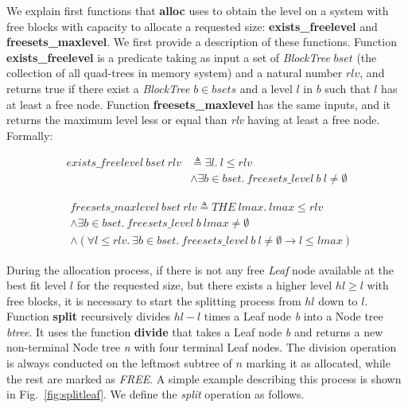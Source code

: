 We explain first functions that \textbf{alloc}  uses to obtain the level on a system with free blocks with capacity to allocate a requested size: \textbf{exists\_freelevel} and \textbf{freesets\_maxlevel}. We first provide a description of these functions. Function \textbf{exists\_freelevel} is a predicate taking as input a set of \emph{BlockTree} $bset$ (the collection of all quad-trees in memory system) and a natural number $rlv$, and returns true if there exist a \emph{BlockTree} $b\in bsets$ and a level $l$ in $b$ such that $l$ has at least a free node. Function \textbf{freesets\_maxlevel} has the same inputs, and it returns the maximum level less or equal than \emph{rlv} having at least a free node. Formally:

\begin{definition} 
\end{definition}
\vspace{-7pt}
{\footnotesize
\begin{align*}
exists\_freelevel\ bset\ rlv &\triangleq \exists l.\ l \leq rlv \\
&\wedge \exists b \in bset.\ freesets\_level\ b\ l \ne \emptyset
\end{align*}
}
\vspace{-12pt}

\begin{definition} 
\end{definition}
\vspace{-7pt}	
{\footnotesize
\begin{align*}
&freesets\_maxlevel\ bset\ rlv \triangleq THE\ lmax.\ lmax \leq rlv \\
&\wedge \exists b \in bset.\ freesets\_level\ b\ lmax \neq \emptyset \\
&\wedge (\forall l \leq rlv.\ \exists b \in bset.\ freesets\_level\ b\ l \ne \emptyset \longrightarrow l \leq lmax)
\end{align*}
}
\vspace{-12pt}

During the allocation process, if there is not any free \emph{Leaf} node available at the best fit level $l$ for the requested size, but there exists a higher level $hl \geq l$ with free blocks, it is necessary to start the splitting process from $hl$ down to $l$. Function \textbf{split} recursively divides  $hl - l$ times a Leaf node \emph{b} into a Node tree \emph{btree}. It uses the function \textbf{divide} that takes a Leaf node \emph{b} and returns a new non-terminal Node tree \emph{n} with four terminal Leaf nodes. The division operation is always conducted on the leftmost subtree of $n$ marking it as allocated, while the rest are marked as \emph{FREE}. A simple example describing this process is shown in Fig.~\ref{fig:splitleaf}. We define the \emph{split} operation as follows.


